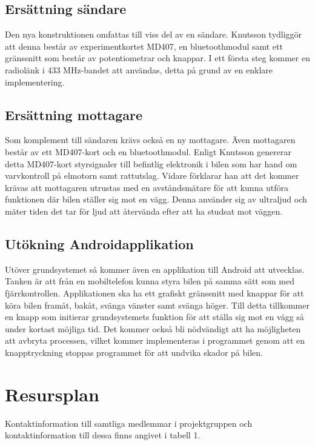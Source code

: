 \documentclass[a4paper]{article}
\begin{document}
\subsection{Ersättning sändare}
Den nya konstruktionen omfattas till viss del av en sändare. Knutsson tydliggör att denna består av experimentkortet MD407, en bluetoothmodul samt ett gränssnitt som består av potentiometrar och knappar. I ett första steg kommer en radiolänk i 433 MHz-bandet att användas, detta på grund av en enklare implementering.

\subsection{Ersättning mottagare}
Som komplement till sändaren krävs också en ny mottagare. Även mottagaren består av ett MD407-kort och en bluetoothmodul. Enligt Knutsson genererar detta MD407-kort styrsignaler till befintlig elektronik i bilen som har hand om varvkontroll på elmotorn samt rattutslag.
Vidare förklarar han att det kommer krävas att mottagaren utrustas med en avståndsmätare för att kunna utföra funktionen där bilen ställer sig mot en vägg. Denna använder sig av ultraljud och mäter tiden det tar för ljud att återvända efter att ha studsat mot väggen.

\subsection{Utökning Androidapplikation}
Utöver grundsystemet så kommer även en applikation till Android att utvecklas. Tanken är att från en mobiltelefon kunna styra bilen på samma sätt som med fjärrkontrollen. Applikationen ska ha ett grafiskt gränssnitt med knappar för att köra bilen framåt, bakåt, svänga vänster samt svänga höger. Till detta tillkommer en knapp som initierar grundsystemets funktion för att ställa sig mot en vägg så under kortast möjliga tid. Det kommer också bli nödvändigt att ha möjligheten att avbryta processen, vilket kommer implementeras i programmet genom att en knapptryckning stoppas programmet för att undvika skador på bilen.

\section{Resursplan}
Kontaktinformation till samtliga medlemmar i projektgruppen och kontaktinformation till dessa finns angivet i tabell 1.
\vspace{5mm}
\end{document}
